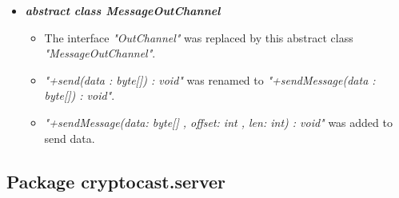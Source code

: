 \documentclass[a4paper,10pt]{scrartcl}
\begin{document}
\begin{itemize}
	 \item \textbf{\textit{abstract class MessageOutChannel}}
	\begin{itemize}
	 \item The interface \textit{"OutChannel"} was replaced by this abstract class \textit{"MessageOutChannel"}.
	 \item \textit{"+send(data : byte[]) : void"} was renamed to \textit{"+sendMessage(data : byte[]) : void"}.
	 \item \textit{"+sendMessage(data: byte[] , offset: int , len: int) : void"} was added to send data.
	\end{itemize}
	
\end{itemize}

\subsection{Package cryptocast.server}
\end{document}
